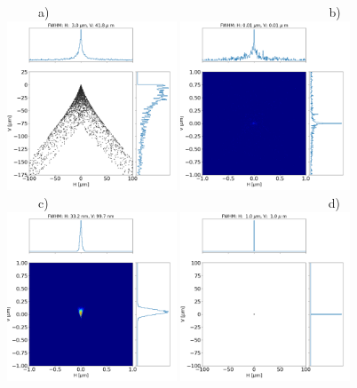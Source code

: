 \documentclass{iucr}              %
\begin{document}
\begin{figure}\label{fig:bl}
\centering
\flushleft
~~~~~a)~~~~~~~~~~~~~~~~~~~~~~~~~~~~~~~~~~~~~~~~~~~~~b) \\
\includegraphics[width=0.45\textwidth]{figures/bl_point_toroid.png} 
\includegraphics[width=0.45\textwidth]{figures/bl_point_parabolic-cone.png} \\
\flushleft
~~~~~c)~~~~~~~~~~~~~~~~~~~~~~~~~~~~~~~~~~~~~~~~~~~~~d) \\
\includegraphics[width=0.45\textwidth]{figures/bl_point_diaboloid.png}
\includegraphics[width=0.45\textwidth]{figures/bl_point_diaboloid-exact.png}

\end{figure}
\end{document}
